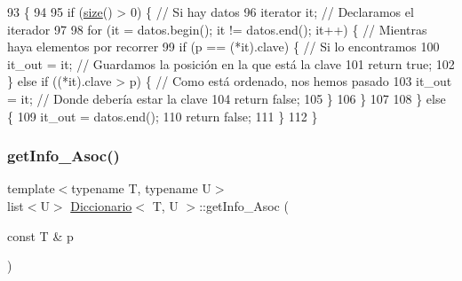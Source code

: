 \begin{DoxyCode}
93                                                   \{
94 
95         \textcolor{keywordflow}{if} (\hyperlink{classDiccionario_aa576b001759429fd58210ca57257d6f8}{size}() > 0) \{                                                       \textcolor{comment}{// Si hay datos}
96             iterator it;                            \textcolor{comment}{// Declaramos el iterador                }
97 
98             \textcolor{keywordflow}{for} (it = datos.begin(); it != datos.end(); it++) \{                 \textcolor{comment}{// Mientras haya elementos
       por recorrer}
99                 \textcolor{keywordflow}{if} (p == (*it).clave) \{                                         \textcolor{comment}{// Si lo encontramos}
100                     it\_out = it;                                                \textcolor{comment}{// Guardamos la posición en
       la que está la clave}
101                     \textcolor{keywordflow}{return} \textcolor{keyword}{true};
102                 \} \textcolor{keywordflow}{else} \textcolor{keywordflow}{if} ((*it).clave > p) \{                                   \textcolor{comment}{// Como está ordenado, nos
       hemos pasado}
103                     it\_out = it;                                                \textcolor{comment}{// Donde debería estar la
       clave}
104                     \textcolor{keywordflow}{return} \textcolor{keyword}{false};
105                 \}
106             \}
107 
108         \} \textcolor{keywordflow}{else} \{
109             it\_out = datos.end();
110             \textcolor{keywordflow}{return} \textcolor{keyword}{false};
111         \}
112     \}
\end{DoxyCode}
\mbox{\label{classDiccionario_ad262cd8d8e11286beecfa4851ec2c948}} 
\subsubsection{\texorpdfstring{get\+Info\+\_\+\+Asoc()}{getInfo\_Asoc()}}
{\footnotesize\ttfamily template$<$typename T, typename U$>$ \\
list$<$U$>$ \hyperlink{classDiccionario}{Diccionario}$<$ T, U $>$\+::get\+Info\+\_\+\+Asoc (\begin{DoxyParamCaption}\item[{const T \&}]{p }\end{DoxyParamCaption})\hspace{0.3cm}{\ttfamily [inline]}}

